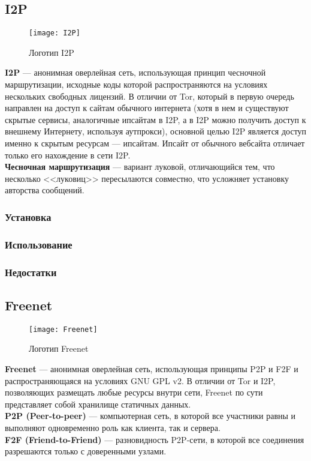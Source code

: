 \subsection{I2P}
\begin{wrapfigure}[6]{r}{0.25\linewidth}
\texttt{[image: I2P]}
\caption{Логотип I2P}
\end{wrapfigure}
\textbf{I2P} --- анонимная оверлейная сеть, использующая принцип чесночной маршрутизации, исходные коды которой распространяются на условиях нескольких свободных лицензий\cite{i2p_license}. В отличии от Tor, который в первую очередь направлен на доступ к сайтам обычного интернета (хотя в нем и существуют скрытые сервисы, аналогичные ипсайтам в I2P, а в I2P можно получить доступ к внешнему Интернету, используя аутпрокси), основной целью I2P является доступ именно к скрытым ресурсам --- ипсайтам. Ипсайт от обычного вебсайта отличает только его нахождение в сети I2P.\\
\textbf{Чесночная маршрутизация} --- вариант луковой, отличающийся тем, что несколько <<луковиц>> пересылаются совместно, что усложняет установку авторства сообщений.
\subsubsection{Установка}
\subsubsection{Использование}
\subsubsection{Недостатки}
\subsection{Freenet}
\begin{wrapfigure}[9]{r}{0.25\linewidth}
\texttt{[image: Freenet]}
\caption{Логотип Freenet}
\end{wrapfigure}
\textbf{Freenet} --- анонимная оверлейная сеть, использующая принципы P2P и F2F и распространяющаяся на условиях GNU GPL v2\cite{freenet_license}. В отличии от Tor и I2P, позволяющих размещать любые ресурсы внутри сети, Freenet по сути представляет собой хранилище статичных данных.\\
\textbf{P2P (Peer-to-peer)} --- компьютерная сеть, в которой все участники равны и выполняют одновременно роль как клиента, так и сервера.\\
\textbf{F2F (Friend-to-Friend)} --- разновидность P2P-сети, в которой все соединения разрешаются только с доверенными узлами.
